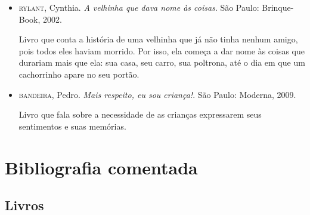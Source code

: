 \documentclass[11pt]{extarticle}
\begin{document}
\begin{itemize}
\item \textsc{rylant}, Cynthia. \textit{A velhinha que dava nome às coisas}. São Paulo: Brinque-Book, 2002.

Livro que conta a história de uma velhinha que já não tinha nenhum amigo, pois todos eles haviam morrido. Por isso, ela começa a dar nome às coisas que durariam mais que ela: sua casa, seu carro, sua poltrona, até o dia em que um cachorrinho apare no seu portão.

\item \textsc{bandeira}, Pedro. \textit{Mais respeito, eu sou criança!}. São Paulo: Moderna, 2009.

Livro que fala sobre a necessidade de as crianças expressarem seus sentimentos e suas memórias.

\end{itemize}

\section{Bibliografia comentada}
\subsection{Livros}
\end{document}

